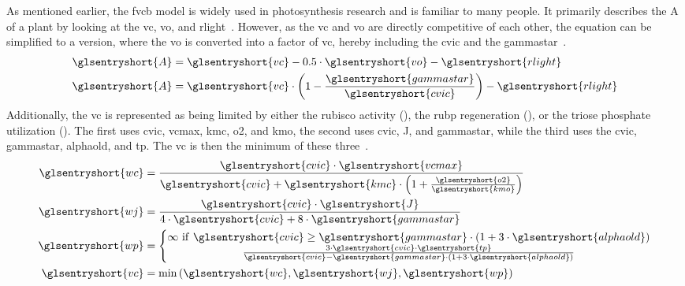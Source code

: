 As mentioned earlier, the \gls{fvcb} model is widely used in photosynthesis research and is familiar to many people. It primarily describes the \gls{A} of a plant by looking at the \gls{vc}, \gls{vo}, and \gls{rlight}~\cite{farquharBiochemicalModelPhotosynthetic1980,voncaemmererSteadystateModelsPhotosynthesis2013}. However, as the \gls{vc} and \gls{vo} are directly competitive of each other, the equation can be simplified to a version, where the \gls{vo} is converted into a factor of \gls{vc}, hereby including the \gls{cvic} and the \gls{gammastar}~.
\begin{equation}\label{eq:fvcb-A}
    \begin{aligned}
        \glsentryshort{A} &= \glsentryshort{vc} - 0.5 \cdot \glsentryshort{vo} - \glsentryshort{rlight}\\
        \glsentryshort{A} &= \glsentryshort{vc} \cdot \left( 1 - \frac{\glsentryshort{gammastar}}{\glsentryshort{cvic}}\right) - \glsentryshort{rlight}
\end{aligned}
\end{equation}
Additionally, the \gls{vc} is represented as being limited by either the \gls{rubisco} activity (), the \gls{rubp} regeneration (), or the triose phosphate utilization (). The first uses \gls{cvic}, \gls{vcmax}, \gls{kmc}, \gls{o2}, and \gls{kmo}, the second uses \gls{cvic}, \gls{J}, and \gls{gammastar}, while the third uses the \gls{cvic}, \gls{gammastar}, \gls{alphaold}, and \gls{tp}. The \gls{vc} is then the minimum of these three~.
\begin{equation}\label{eq:fvcb-vc}
    \begin{aligned}
        \glsentryshort{wc} &= \frac{\glsentryshort{cvic} \cdot \glsentryshort{vcmax}}{\glsentryshort{cvic} + \glsentryshort{kmc} \cdot \left(1 + \frac{\glsentryshort{o2}}{\glsentryshort{kmo}}\right)}\\
        \glsentryshort{wj} &= \frac{\glsentryshort{cvic} \cdot \glsentryshort{J}}{4 \cdot \glsentryshort{cvic} + 8 \cdot \glsentryshort{gammastar}}\\
        \glsentryshort{wp} &= \left\{\begin{matrix}
                            \infty \ \mathrm{if}\ \glsentryshort{cvic} \geq \glsentryshort{gammastar} \cdot \left(1 + 3 \cdot \glsentryshort{alphaold}\right) \\ \frac{3 \cdot \glsentryshort{cvic} \cdot \glsentryshort{tp}}{\glsentryshort{cvic} - \glsentryshort{gammastar} \cdot \left(1 + 3 \cdot \glsentryshort{alphaold}\right)}
                            \end{matrix}\right.\\
        \glsentryshort{vc} &= \min\left(\glsentryshort{wc}, \glsentryshort{wj}, \glsentryshort{wp}\right)
    \end{aligned}
\end{equation}
